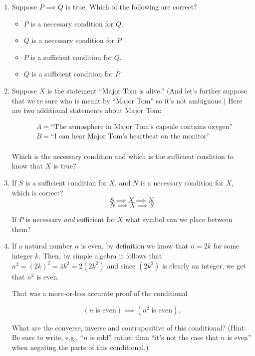 \documentclass{amsart}
\begin{document}
\begin{enumerate}
\vspace{.5in}

\item Suppose $P \implies Q$ is true.  Which of the following are correct?

\begin{itemize}
\item $P$ is a necessary condition for $Q$.
\item $Q$ is a necessary condition for $P$
\item $P$ is a sufficient condition for $Q$.
\item $Q$ is a sufficient condition for $P$
\end{itemize}

\vfill

\newpage

\item Suppose $X$ is the statement ``Major Tom is alive.''  (And let's further suppose that we're sure who is meant by ``Major Tom'' so it's not ambiguous.)  Here are two additional statements about Major Tom:

\begin{align*}
 & A = \mbox{``The atmosphere in Major Tom's capsule contains oxygen''} \\
 & B = \mbox{``I can hear Major Tom's heartbeat on the monitor''} \\
\end{align*}

Which is the necessary condition and which is the sufficient condition to know that $X$ is true?

\vfill

\item If $S$ is a sufficient condition for $X$, and $N$ is a necessary condition for $X$, which is correct?
\[ S \implies X \implies N \]
\[ N \implies X \implies S \]

If $P$ is necessary {\em and} sufficient for $X$ what symbol can we place between them?

\vfill

\newpage

\item If a natural number $n$ is even, by definition we know that $n = 2k$ for some integer $k$.  Then, by simple algebra it follows that $n^2 = (2k)^2 = 4k^2 = 2(2k^2)$ and since $(2k^2)$ is clearly an integer, we get that $n^2$ is even.

That was a more-or-less accurate proof of the conditional 

\[ (n \; \mbox{is even}) \implies (n^2 \; \mbox{is even}). \]

What are the converse, inverse and contrapositive of this conditional?  (Hint: Be sure to write, e.g., ``$n$ is odd'' rather than ``it's not the case that $n$ is even'' when negating the parts of this conditional.)

\vfill



\end{enumerate}
\end{document}
